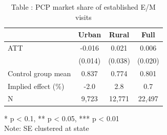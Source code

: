 \begin{table}[t]
\caption*{
{\fontsize{20}{25}\selectfont  Table : PCP market share of established E/M visits\fontsize{12}{15}\selectfont }
} 
\fontsize{12.0pt}{14.0pt}\selectfont
\begin{tabular*}{\linewidth}{@{\extracolsep{\fill}}lccc}
\toprule
  & Urban & Rural & Full \\ 
\midrule\addlinespace[2.5pt]
ATT & -0.016 & 0.021 & 0.006 \\ 
 & (0.014) & (0.038) & (0.020) \\ 
Control group mean & 0.837 & 0.774 & 0.801 \\ 
Implied effect (\%) & -2.0 & 2.8 & 0.7 \\ 
N & 9,723 & 12,771 & 22,497 \\ 
\bottomrule
\end{tabular*}
\begin{minipage}{\linewidth}
* p < 0.1, ** p < 0.05, *** p < 0.01\\
Note: SE clustered at state\\
\end{minipage}
\end{table}

